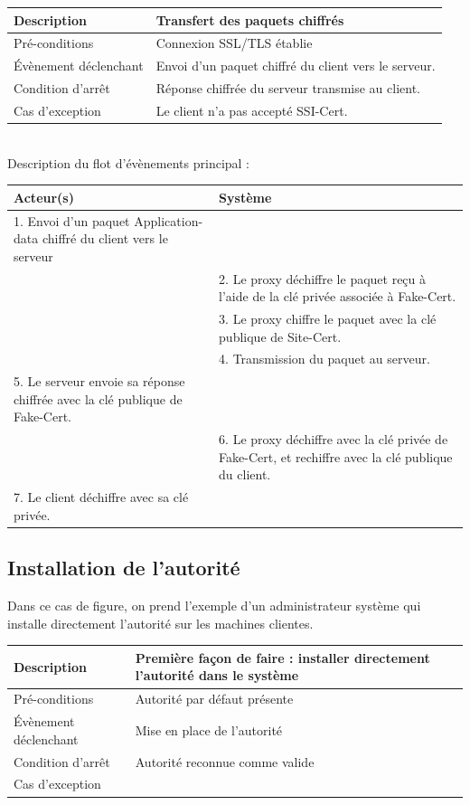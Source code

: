 \documentclass[a4paper,11pt,french]{article}
\begin{document}
\begin{tabular}{|>{\columncolor[gray]{.8}}m{4cm}|m{12cm}|}
   \hline
   Description & Transfert des paquets chiffrés \\
   \hline
   Pré-conditions & Connexion SSL/TLS établie \\
   \hline
   Évènement déclenchant &  Envoi d'un paquet chiffré du client vers le serveur. \\
   \hline
   Condition d'arrêt & Réponse chiffrée du serveur transmise au client. \\
   \hline
   Cas d'exception  & Le client n'a pas accepté SSI-Cert. \\
   \hline   
\end{tabular}
~\\
Description du flot d'évènements principal :

\begin{tabular}{|m{8cm}|m{8cm}|}
   \hline
  \rowcolor[gray]{.8} Acteur(s) & Système \\
   \hline
   1. Envoi d'un paquet Application-data chiffré du client vers le serveur& \\
   \hline
& 2. Le proxy déchiffre le paquet reçu à l'aide de la clé privée associée à Fake-Cert. \\
& 3. Le proxy chiffre le paquet avec la clé publique de Site-Cert.  \\
   \hline
 & 4. Transmission du paquet au serveur. \\
   \hline
5. Le serveur envoie sa réponse chiffrée avec la clé publique de Fake-Cert. &  \\
   \hline
  &  6. Le proxy déchiffre avec la clé privée de Fake-Cert, et rechiffre avec la clé publique du client.   \\
   \hline
      7. Le client déchiffre avec sa clé privée. &  \\
   \hline
\end{tabular}

\subsection{Installation de l'autorité}

Dans ce cas de figure, on prend l'exemple d'un administrateur système qui installe directement l'autorité sur les machines clientes.

\begin{tabular}{|>{\columncolor[gray]{.8}}m{4cm}|m{12cm}|}

   \hline
   Description & Première façon de faire : installer directement l'autorité dans le système\\
   \hline
   Pré-conditions &Autorité par défaut présente \\
   \hline
   Évènement déclenchant &  Mise en place de l'autorité\\
   \hline
   Condition d'arrêt & Autorité reconnue comme valide \\
   \hline
   Cas d'exception  & \\
   \hline   
\end{tabular}
\end{document}
